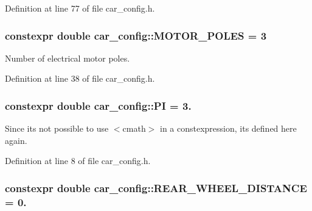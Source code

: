 Definition at line 77 of file car\+\_\+config.\+h.

\subsubsection[{\texorpdfstring{M\+O\+T\+O\+R\+\_\+\+P\+O\+L\+ES}{MOTOR_POLES}}]{\setlength{\rightskip}{0pt plus 5cm}constexpr double car\+\_\+config\+::\+M\+O\+T\+O\+R\+\_\+\+P\+O\+L\+ES = 3}\hypertarget{namespacecar__config_a611a0f02cf52db1d438a2dd53b642cd5}{}\label{namespacecar__config_a611a0f02cf52db1d438a2dd53b642cd5}


Number of electrical motor poles. 



Definition at line 38 of file car\+\_\+config.\+h.

\subsubsection[{\texorpdfstring{PI}{PI}}]{\setlength{\rightskip}{0pt plus 5cm}constexpr double car\+\_\+config\+::\+PI = 3.}\hypertarget{namespacecar__config_a90cb9957197db8924811c447bc98703a}{}\label{namespacecar__config_a90cb9957197db8924811c447bc98703a}


Since it\textquotesingle{}s not possible to use $<$cmath$>$ in a constexpression, it\textquotesingle{}s defined here again. 



Definition at line 8 of file car\+\_\+config.\+h.

\subsubsection[{\texorpdfstring{R\+E\+A\+R\+\_\+\+W\+H\+E\+E\+L\+\_\+\+D\+I\+S\+T\+A\+N\+CE}{REAR_WHEEL_DISTANCE}}]{\setlength{\rightskip}{0pt plus 5cm}constexpr double car\+\_\+config\+::\+R\+E\+A\+R\+\_\+\+W\+H\+E\+E\+L\+\_\+\+D\+I\+S\+T\+A\+N\+CE = 0.}\hypertarget{namespacecar__config_a43e668702c6dc662ff95f80047ee5500}{}\label{namespacecar__config_a43e668702c6dc662ff95f80047ee5500}


